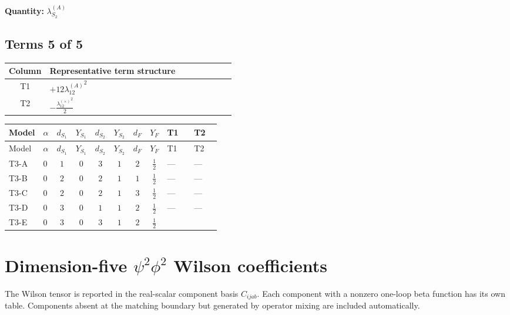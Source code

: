 \documentclass[8pt]{article}
\begin{document}
\begin{landscape}
\begin{longtable}{@{}llcccccc >{\raggedright\arraybackslash}p{0.21\linewidth} >{\raggedright\arraybackslash}p{0.21\linewidth} >{\raggedright\arraybackslash}p{0.21\linewidth}@{}}
\midrule
\bottomrule
\end{longtable}
\clearpage
\noindent\textbf{Quantity: }$\lambda_{S_2}^{(A)}$\par\smallskip
\subsection*{Terms 5 of 5}
\begin{center}
\begin{tabular}{@{}c >{\raggedright\arraybackslash}p{0.82\linewidth}@{}}
\toprule
Column & Representative term structure \\
\midrule
T1 & \(\displaystyle +12 {\lambda_{12}^{(A)}}^2\) \\
\midrule
T2 & \(\displaystyle -\frac{{\lambda_{12}^{(\times)}}^2}{2}\) \\
\midrule
\bottomrule
\end{tabular}
\end{center}
\smallskip
\tiny
\begin{longtable}{@{}llcccccc >{\raggedright\arraybackslash}p{0.21\linewidth} >{\raggedright\arraybackslash}p{0.21\linewidth}@{}}
\toprule
Model & $\alpha$ & $d_{S_1}$ & $Y_{S_1}$ & $d_{S_2}$ & $Y_{S_2}$ & $d_F$ & $Y_F$ & T1 & T2 \\
\midrule
\endfirsthead
\toprule
Model & $\alpha$ & $d_{S_1}$ & $Y_{S_1}$ & $d_{S_2}$ & $Y_{S_2}$ & $d_F$ & $Y_F$ & T1 & T2 \\
\midrule
\endhead
T3-A & $0$ & $1$ & $0$ & $3$ & $1$ & $2$ & $\frac{1}{2}$ & --- & --- \\
\midrule
T3-B & $0$ & $2$ & $0$ & $2$ & $1$ & $1$ & $\frac{1}{2}$ & --- & --- \\
\midrule
T3-C & $0$ & $2$ & $0$ & $2$ & $1$ & $3$ & $\frac{1}{2}$ & --- & --- \\
\midrule
T3-D & $0$ & $3$ & $0$ & $1$ & $1$ & $2$ & $\frac{1}{2}$ & --- & --- \\
\midrule
T3-E & $0$ & $3$ & $0$ & $3$ & $1$ & $2$ & $\frac{1}{2}$ & \scriptsize\adjustbox{max width=\linewidth}{$\begin{gathered} +12 {\lambda_{12}^{(A)}}^2\end{gathered}$} & \scriptsize\adjustbox{max width=\linewidth}{$\begin{gathered} -\frac{{\lambda_{12}^{(\times)}}^2}{2}\end{gathered}$} \\
\midrule
\bottomrule
\end{longtable}
\clearpage
\section*{Dimension-five $\psi^2\phi^2$ Wilson coefficients}
The Wilson tensor is reported in the real-scalar component basis $C_{ijab}$. Each component with a nonzero one-loop beta function has its own table. Components absent at the matching boundary but generated by operator mixing are included automatically.

\end{landscape}
\end{document}

